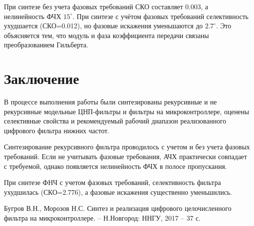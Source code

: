 \documentclass[a4paper,14pt]{extarticle}
\begin{document}
При синтезе без учета фазовых требований СКО составляет 0.003, а нелинейность ФЧХ $15^\circ$. При синтезе с учётом фазовых требований селективность ухудшается (СКО=0.012), но фазовые искажения уменьшаются до $2.7^\circ$. Это объясняется тем, что модуль и фаза коэффициента передачи связаны преобразованием Гильберта.




\section*{Заключение}

В процессе выполнения работы были синтезированы рекурсивные и не рекурсивные модельные  ЦНП-фильтры и фильтры на микроконтроллере, оценены селективные свойства и рекомендуемый рабочий диапазон реализованного цифрового фильтра нижних частот.

Синтезирование рекурсивного фильтра проводилось с учетом и без учета фазовых требований. Если не учитывать фазовые требования, АЧХ практически совпадает с требуемой, однако появляется нелинейность ФЧХ в полосе пропускания. 

При синтезе ФНЧ с учетом фазовых требований, селективность фильтра ухудшилась (СКО=2.776), а фазовые искажения существенно уменьшились.

\begin{thebibliography}{}

   Бугров В.Н., Морозов Н.С. Синтез и реализация цифрового целочисленного фильтра на микроконтроллере. -- Н.Новгород: ННГУ, 2017 -- 37 с.
\end{thebibliography}
\end{document}
